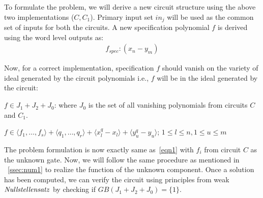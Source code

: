 To formulate the problem, we will derive a new circuit structure using the above two implementations ($C,C_1$). Primary input set $in_j$ will be used as the common set of inputs for both the circuits. A new specification polynomial $f$ is derived using the word level outputs as:
\begin{gather}
f_{spec} : (x_n-y_m)
\end{gather}

Now, for a correct implementation, specification $f$ should vanish on the variety of ideal generated by the circuit polynomials i.e., $f$ will be in the ideal generated by the circuit:

$f \in J_1 + J_2 + J_0$: where $J_0$ is the set of all vanishing polynomials from circuits $C$ and $C_1$.

{\small $f \in \langle f_1,\dots,f_s\rangle + \langle q_1,\dots,q_r\rangle + \langle x_l^q-x_l\rangle + \langle y_u^q-y_u\rangle$; $1\le l \le n,1\le u \le m$}

The problem formulation is now exactly same as~\eqref{eqn1} with $f_i$ from circuit $C$ as the unknown gate. Now, we will follow the same procedure as mentioned in ~\ref{ssec:num1} to realize the function of the unknown component. Once a solution has been computed, we can verify the circuit using principles from weak $\it{Nullstellensatz}$ by checking if $GB(J_1+J_2+J_0)=\{1\}$.







